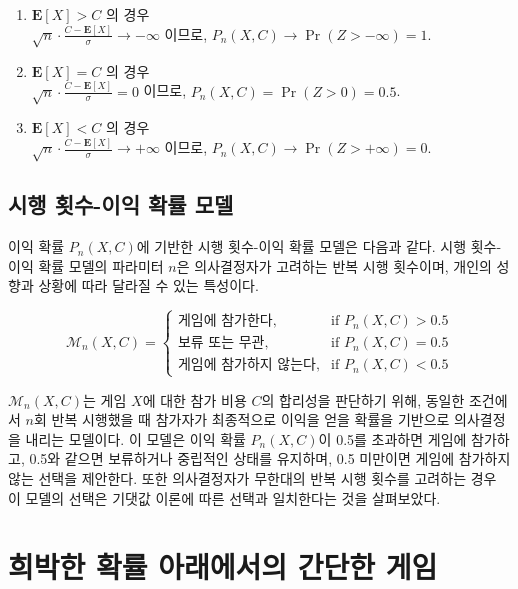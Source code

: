 \begin{enumerate}
  \item $\mathbf{E}[X] > C$ 의 경우 \\
        $\sqrt{n} \cdot \frac{C - \mathbf{E}[X]}{\sigma} \to -\infty$ 이므로,
        $P_n(X, C) \to \Pr(Z > -\infty) = 1$.

  \item $\mathbf{E}[X] = C$ 의 경우 \\
        $\sqrt{n} \cdot \frac{C - \mathbf{E}[X]}{\sigma} = 0$ 이므로,
        $P_n(X, C) = \Pr(Z > 0) = 0.5$.

  \item $\mathbf{E}[X] < C$ 의 경우 \\
        $\sqrt{n} \cdot \frac{C - \mathbf{E}[X]}{\sigma} \to +\infty$ 이므로,
        $P_n(X, C) \to \Pr(Z > +\infty) = 0$.
\end{enumerate}

\subsection{시행 횟수-이익 확률 모델}

이익 확률 $P_n(X, C)$에 기반한 시행 횟수-이익 확률 모델은 다음과 같다. 시행 횟수-이익 확률 모델의 파라미터 $n$은 의사결정자가 고려하는 반복 시행 횟수이며, 개인의 성향과 상황에 따라 달라질 수 있는 특성이다.

\[
  \mathcal{M}_n(X, C)
  =\begin{cases}
    \text{게임에 참가한다,}     & \text{if }P_n(X, C)>0.5  \\
    \text{보류 또는 무관,}     & \text{if }P_n(X, C)=0.5  \\
    \text{게임에 참가하지 않는다,} & \text{if } P_n(X, C)<0.5
  \end{cases}
\]

$\mathcal{M}_n(X, C)$는 게임 $X$에 대한 참가 비용 $C$의 합리성을 판단하기 위해, 동일한 조건에서 $n$회 반복 시행했을 때  참가자가 최종적으로 이익을 얻을 확률을 기반으로 의사결정을 내리는 모델이다. 이 모델은 이익 확률 $P_n(X, C)$이 0.5를 초과하면 게임에 참가하고, 0.5와 같으면 보류하거나 중립적인 상태를 유지하며, 0.5 미만이면 게임에 참가하지 않는 선택을 제안한다. 또한 의사결정자가 무한대의 반복 시행 횟수를 고려하는 경우 이 모델의 선택은 기댓값 이론에 따른 선택과 일치한다는 것을 살펴보았다.


\section{희박한 확률 아래에서의 간단한 게임}

